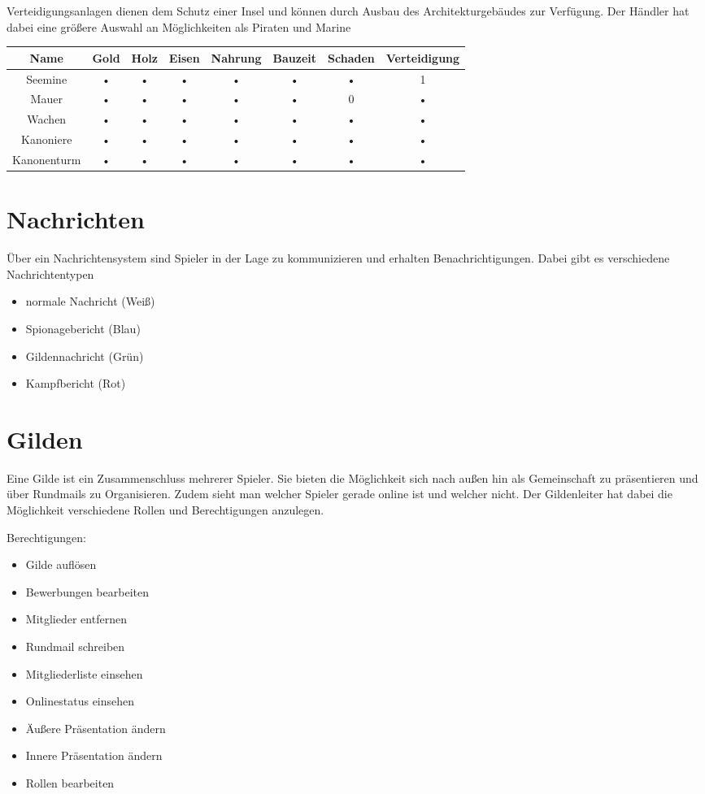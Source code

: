 \documentclass[10pt,a4paper]{article}
\begin{document}
Verteidigungsanlagen dienen dem Schutz einer Insel und können durch Ausbau des Architekturgebäudes zur Verfügung. Der Händler hat dabei eine größere Auswahl an Möglichkeiten als Piraten und Marine
\\[3mm]
\begin{tabular}{|c|c|c|c|c|c|c|c|}
\hline 
Name & Gold & Holz & Eisen & Nahrung & Bauzeit & Schaden & Verteidigung \\ 
\hline 
Seemine & • & • & • & • & • & • & 1 \\ 
\hline 
Mauer & • & • & • & • & • & 0 & • \\ 
\hline 
Wachen & • & • & • & • & • & • & • \\ 
\hline 
Kanoniere & • & • & • & • & • & • & • \\ 
\hline 
Kanonenturm & • & • & • & • & • & • & • \\ 
\hline 
\end{tabular} 

\section{Nachrichten}

Über ein Nachrichtensystem sind Spieler in der Lage zu kommunizieren und erhalten Benachrichtigungen. Dabei gibt es verschiedene Nachrichtentypen

\begin{itemize}
\item normale Nachricht (Weiß)
\item Spionagebericht (Blau)
\item Gildennachricht (Grün)
\item Kampfbericht (Rot)
\end{itemize}

\section{Gilden}

Eine Gilde ist ein Zusammenschluss mehrerer Spieler. Sie bieten die Möglichkeit sich nach außen hin als Gemeinschaft zu präsentieren und über Rundmails zu Organisieren. Zudem sieht man welcher Spieler gerade online ist und welcher nicht. Der Gildenleiter hat dabei die Möglichkeit verschiedene Rollen und Berechtigungen anzulegen.

Berechtigungen:
\begin{itemize}
\item Gilde auflösen
\item Bewerbungen bearbeiten
\item Mitglieder entfernen
\item Rundmail schreiben
\item Mitgliederliste einsehen
\item Onlinestatus einsehen
\item Äußere Präsentation ändern
\item Innere Präsentation ändern
\item Rollen bearbeiten
\end{itemize}
\end{document}
